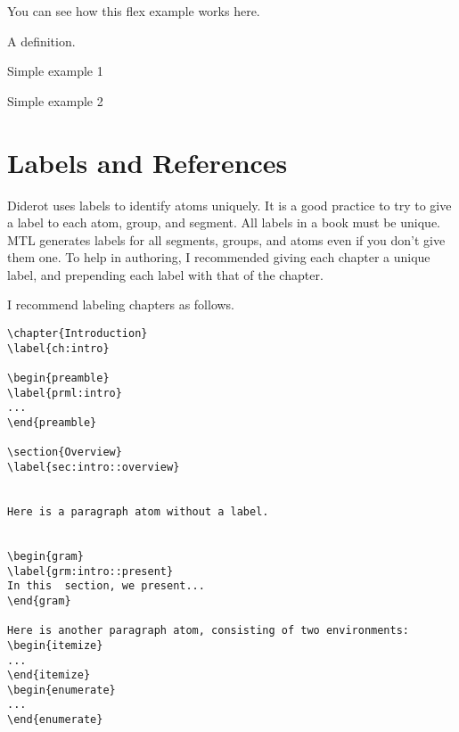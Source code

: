You can see how this flex example works here.


\begin{flex}
\begin{definition}[A Definition]
\label{def:a}
A definition.
\end{definition}

\begin{example}
\label{ex:simple-1}
Simple example 1
\end{example}

\begin{example}
\label{ex:simple-2}
Simple example 2
\end{example}

\end{flex}
  

\section{Labels and References}

Diderot uses labels to identify atoms uniquely.  It is a good practice
to try to give a label to each atom, group, and segment.  All labels
in a book must be unique.  MTL generates labels for all segments,
groups, and atoms even if you don't give them one.  To help in
authoring, I recommended giving each chapter a unique label, and
prepending each label with that of the chapter.


\begin{example}

I recommend labeling chapters as follows.

\begin{lstlisting}
\chapter{Introduction}
\label{ch:intro}

\begin{preamble}
\label{prml:intro}
...
\end{preamble}

\section{Overview}
\label{sec:intro::overview}


Here is a paragraph atom without a label. 


\begin{gram}
\label{grm:intro::present}
In this  section, we present...
\end{gram}

Here is another paragraph atom, consisting of two environments:
\begin{itemize}
...
\end{itemize}
\begin{enumerate}
...
\end{enumerate}

\end{lstlisting}
\end{example}

